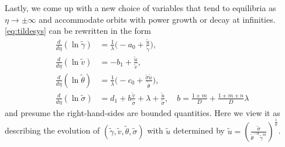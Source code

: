 \documentclass[a4paper,11pt]{article}
\def\tg{{\tilde{\gamma}}}
\def\tv{{\tilde{v}}}
\def\tth{{\tilde{\theta}}}
\def\ts{{\tilde{\sigma}}}
\def\tu{{\tilde{u}}}
\theoremstyle{remark}
\begin{document}
Lastly, we come up with a new choice of variables that tend to equilibria as $\eta \rightarrow \pm \infty$ and accommodate
orbits with power growth or decay at infinities. \eqref{eq:tildesys} can be rewritten in the form
\begin{equation}
 \label{eq:tildesys2}
\begin{aligned}
\frac{d}{d\eta}{(\ln{\tg})}  &=  \tfrac{1}{\lambda} \big (- a_0 +  \frac{\tu}{\tg} \big ),
\\
\frac{d}{d\eta}{(\ln{\tv})}  &=  - b_1 + \frac{\tu}{\tv} ,
\\
\frac{d}{d\eta}{(\ln{\tth})} &=   \tfrac{1}{\lambda} \big (- c_0 +  \frac{\ts \tu}{\tth} \big ),
\\
\frac{d}{d\eta}{(\ln{\ts})} &= d_1 + b \frac{\tv}{\ts} + \lambda + \frac{\tu}{\ts}, \quad b = \frac{1+m}{D} + \frac{1+m+n}{D}\lambda
\end{aligned}
\end{equation}
and presume the right-hand-sides are bounded quantities. Here we view it as describing the evolution of $(\tg,\tv,\tth,\ts)$ with $\tu$ determined by $\tu = \left ( \frac{\ts}{ \tth^{-\alpha} \tg^m} \right )^\frac{1}{n}$.
\end{document}
